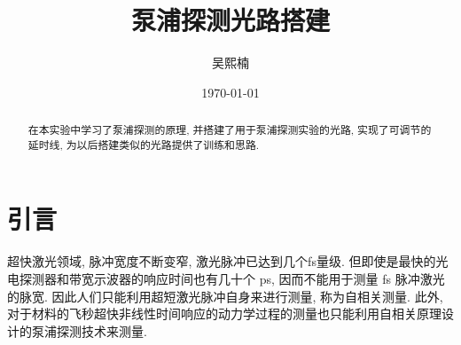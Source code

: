 \documentclass[aps,pre,12pt,preprint,%
	onecolumn,showpacs,showkeys,nofootinbib]{revtex4-2}
\begin{document}
	\title{%
	\texstringonly{\hfil\\[2\baselineskip]}
	\sf\LARGE%
		泵浦探测光路搭建%
	\texstringonly{\vspace{3ex}}}
	\author{\fangsong\large%
		吴熙楠%
	\vspace{2mm}}
	\date{\today}
	
\begin{abstract}
\vspace{10mm}
\begin{spacing}{1.5}\normalsize
\setlength{\parskip}{.3\baselineskip}
%	
在本实验中学习了泵浦探测的原理, 并搭建了用于泵浦探测实验的光路, 实现了可调节的延时线, 为以后搭建类似的光路提供了训练和思路.
\end{spacing}
\end{abstract}
\clearpage
\maketitle
\thispagestyle{titlepagestyle}
%

\newpage
\section{引言}
超快激光领域, 脉冲宽度不断变窄, 激光脉冲已达到几个fs量级. 但即使是最快的光电探测器和带宽示波器的响应时间也有几十个 ps, 因而不能用于测量 fs 脉冲激光的脉宽. 因此人们只能利用超短激光脉冲自身来进行测量, 称为自相关测量. 此外, 对于材料的飞秒超快非线性时间响应的动力学过程的测量也只能利用自相关原理设计的泵浦探测技术来测量.
\end{document}

